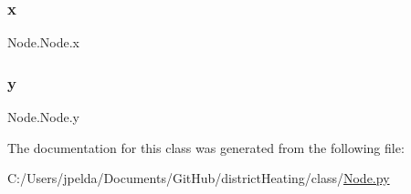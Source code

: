 \subsubsection{\texorpdfstring{x}{x}}
{\footnotesize\ttfamily Node.\+Node.\+x}

\mbox{\label{class_node_1_1_node_aab9b32354c529afe23970aeda52308b9}} 
\subsubsection{\texorpdfstring{y}{y}}
{\footnotesize\ttfamily Node.\+Node.\+y}



The documentation for this class was generated from the following file\+:\begin{DoxyCompactItemize}
\item 
C\+:/\+Users/jpelda/\+Documents/\+Git\+Hub/district\+Heating/class/\hyperlink{_node_8py}{Node.\+py}\end{DoxyCompactItemize}

